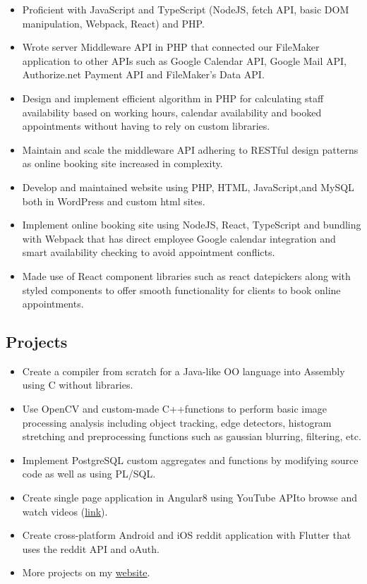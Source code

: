 \documentclass[]{resume}
\begin{document}

\begin{itemize}
\item Proficient with JavaScript and TypeScript (NodeJS, fetch API, basic DOM manipulation, Webpack, React) and PHP.
\item Wrote server Middleware API in PHP that connected our FileMaker application to other APIs such as Google Calendar API, Google Mail API, Authorize.net Payment API and FileMaker’s Data API.
\item Design and implement efficient algorithm in PHP for calculating staff availability based on working hours, calendar availability and booked appointments without having to rely on custom libraries.
\item Maintain and scale the middleware API adhering to RESTful design patterns as online booking site increased in complexity.
\item Develop and maintained website using PHP, HTML, JavaScript,and MySQL both in WordPress and custom html sites.
\item Implement online booking site using NodeJS, React, TypeScript and bundling with Webpack that has direct employee Google calendar integration and smart availability checking to avoid appointment conflicts.
\item Made use of React component libraries such as react datepickers along with styled components to offer smooth functionality for clients to book online appointments.
\end{itemize}


\subsection{Projects}
\begin{itemize}
\item Create a compiler from scratch for a Java-like OO language into Assembly using C without libraries.
\item Use OpenCV and custom-made C++functions to perform basic image processing analysis including object tracking, edge detectors, histogram stretching and preprocessing functions such as gaussian blurring, filtering, etc.
\item Implement PostgreSQL custom aggregates and functions by modifying source code as well as using PL/SQL.
\item Create single page application in Angular8 using YouTube APIto browse and watch videos (\href{https://github.com/mushfiq814/youtube-data-api-dogVids}{link}).
\item Create cross-platform Android and iOS reddit application with Flutter that uses the reddit API and oAuth.
\item More projects on my \href{https://mushfiqmahmud.com/html/projects}{website}.
\end{itemize}

\end{document}

